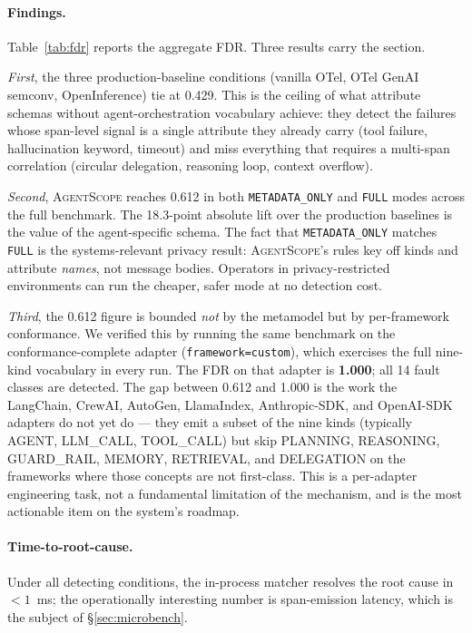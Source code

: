 \documentclass[sigplan,10pt,anonymous,review]{acmart}
\newcommand{\sysname}{\textsc{AgentScope}\xspace}
\begin{document}
\paragraph{Findings.}
Table~\ref{tab:fdr} reports the aggregate FDR. Three results carry the
section.

\emph{First}, the three production-baseline conditions (vanilla OTel,
OTel GenAI semconv, OpenInference) tie at 0.429. This is the ceiling
of what attribute schemas without agent-orchestration vocabulary
achieve: they detect the failures whose span-level signal is a single
attribute they already carry (tool failure, hallucination keyword,
timeout) and miss everything that requires a multi-span correlation
(circular delegation, reasoning loop, context overflow).

\emph{Second}, \sysname{} reaches 0.612 in both
\texttt{METADATA\_ONLY} and \texttt{FULL} modes across the full
benchmark. The 18.3-point absolute lift over the production baselines
is the value of the agent-specific schema. The fact that
\texttt{METADATA\_ONLY} matches \texttt{FULL} is the systems-relevant
privacy result: \sysname{}'s rules key off kinds and attribute
\emph{names}, not message bodies. Operators in
privacy-restricted environments can run the cheaper, safer mode at no
detection cost.

\emph{Third}, the 0.612 figure is bounded \emph{not} by the
metamodel but by per-framework conformance. We verified this by
running the same benchmark on the conformance-complete adapter
(\texttt{framework=custom}), which exercises the full nine-kind
vocabulary in every run. The FDR on that adapter is \textbf{1.000};
all 14 fault classes are detected. The gap between 0.612 and 1.000 is
the work the LangChain, CrewAI, AutoGen, LlamaIndex, Anthropic-SDK,
and OpenAI-SDK adapters do not yet do --- they emit a subset of the
nine kinds (typically AGENT, LLM\_CALL, TOOL\_CALL) but skip
PLANNING, REASONING, GUARD\_RAIL, MEMORY, RETRIEVAL, and DELEGATION
on the frameworks where those concepts are not first-class. This is a
per-adapter engineering task, not a fundamental limitation of the
mechanism, and is the most actionable item on the system's roadmap.

\paragraph{Time-to-root-cause.} Under all detecting conditions, the
in-process matcher resolves the root cause in $<1$~ms; the
operationally interesting number is span-emission latency, which is
the subject of \S\ref{sec:microbench}.
\end{document}
